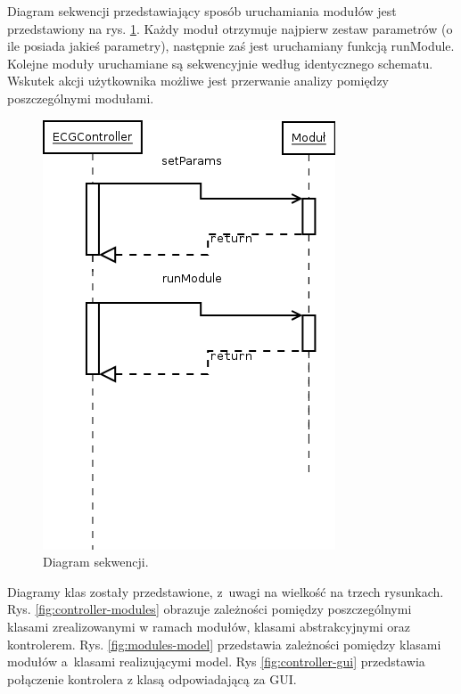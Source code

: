 \documentclass[a4paper, 11pt]{article}
\begin{document}
Diagram sekwencji przedstawiający sposób uruchamiania modułów jest przedstawiony na rys. \ref{fig:sequence_diagram}. Każdy moduł otrzymuje najpierw zestaw parametrów (o ile posiada jakieś parametry), następnie zaś jest uruchamiany funkcją runModule. Kolejne moduły uruchamiane są sekwencyjnie według identycznego schematu. Wskutek akcji użytkownika możliwe jest przerwanie analizy pomiędzy poszczególnymi modułami.

\begin{figure}[h!]
  \centering
  \includegraphics[width=0.5\linewidth]{include/sequence_diagram}
  \caption{Diagram sekwencji.}
  \label{fig:sequence_diagram}
\end{figure}

Diagramy klas zostały przedstawione, z~uwagi na wielkość na trzech rysunkach. Rys. \ref{fig:controller-modules} obrazuje zależności pomiędzy poszczególnymi klasami zrealizowanymi w ramach modułów, klasami abstrakcyjnymi oraz kontrolerem. Rys. \ref{fig:modules-model} przedstawia zależności pomiędzy klasami modułów a~klasami realizującymi model. Rys \ref{fig:controller-gui} przedstawia połączenie kontrolera z klasą odpowiadającą za GUI.
\end{document}
